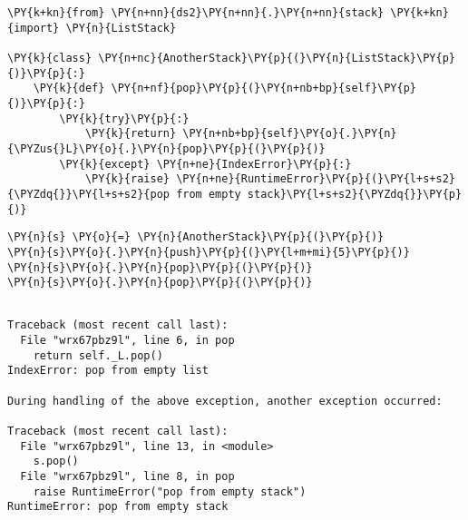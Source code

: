 \begin{Verbatim}[commandchars=\\\{\}]
\PY{k+kn}{from} \PY{n+nn}{ds2}\PY{n+nn}{.}\PY{n+nn}{stack} \PY{k+kn}{import} \PY{n}{ListStack}

\PY{k}{class} \PY{n+nc}{AnotherStack}\PY{p}{(}\PY{n}{ListStack}\PY{p}{)}\PY{p}{:}
    \PY{k}{def} \PY{n+nf}{pop}\PY{p}{(}\PY{n+nb+bp}{self}\PY{p}{)}\PY{p}{:}
        \PY{k}{try}\PY{p}{:}
            \PY{k}{return} \PY{n+nb+bp}{self}\PY{o}{.}\PY{n}{\PYZus{}L}\PY{o}{.}\PY{n}{pop}\PY{p}{(}\PY{p}{)}
        \PY{k}{except} \PY{n+ne}{IndexError}\PY{p}{:}
            \PY{k}{raise} \PY{n+ne}{RuntimeError}\PY{p}{(}\PY{l+s+s2}{\PYZdq{}}\PY{l+s+s2}{pop from empty stack}\PY{l+s+s2}{\PYZdq{}}\PY{p}{)}
\end{Verbatim}



\begin{Verbatim}[commandchars=\\\{\}]
\PY{n}{s} \PY{o}{=} \PY{n}{AnotherStack}\PY{p}{(}\PY{p}{)}
\PY{n}{s}\PY{o}{.}\PY{n}{push}\PY{p}{(}\PY{l+m+mi}{5}\PY{p}{)}
\PY{n}{s}\PY{o}{.}\PY{n}{pop}\PY{p}{(}\PY{p}{)}
\PY{n}{s}\PY{o}{.}\PY{n}{pop}\PY{p}{(}\PY{p}{)}
\end{Verbatim}

\begin{Verbatim}

Traceback (most recent call last):
  File "wrx67pbz9l", line 6, in pop
    return self._L.pop()
IndexError: pop from empty list

During handling of the above exception, another exception occurred:

Traceback (most recent call last):
  File "wrx67pbz9l", line 13, in <module>
    s.pop()
  File "wrx67pbz9l", line 8, in pop
    raise RuntimeError("pop from empty stack")
RuntimeError: pop from empty stack

\end{Verbatim}
